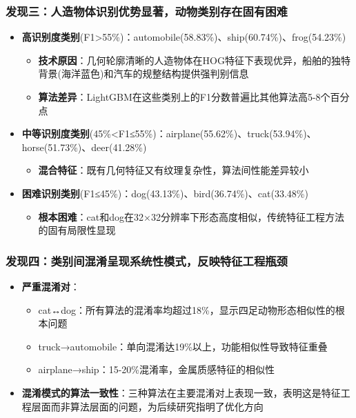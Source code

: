 \documentclass[UTF8]{report}
\theoremstyle{MyLineTheoremStyle} %
\theoremstyle{MyBlockTheoremStyle} %
\theoremstyle{MySubsubsectionStyle} %
\begin{document}
\subsubsection{发现三：人造物体识别优势显著，动物类别存在固有困难}
\begin{itemize}
    \item \textbf{高识别度类别}(F1>55\%)：automobile(58.83\%)、ship(60.74\%)、frog(54.23\%)
    \begin{itemize}
        \item \textbf{技术原因}：几何轮廓清晰的人造物体在HOG特征下表现优异，船舶的独特背景(海洋蓝色)和汽车的规整结构提供强判别信息
        \item \textbf{算法差异}：LightGBM在这些类别上的F1分数普遍比其他算法高5-8个百分点
    \end{itemize}
    \item \textbf{中等识别度类别}(45\%<F1≤55\%)：airplane(55.62\%)、truck(53.94\%)、horse(51.73\%)、deer(41.28\%)
    \begin{itemize}
        \item \textbf{混合特征}：既有几何特征又有纹理复杂性，算法间性能差异较小
    \end{itemize}
    \item \textbf{困难识别类别}(F1≤45\%)：dog(43.13\%)、bird(36.74\%)、cat(33.48\%)
    \begin{itemize}
        \item \textbf{根本困难}：cat和dog在32×32分辨率下形态高度相似，传统特征工程方法的固有局限性显现
    \end{itemize}
\end{itemize}

\subsubsection{发现四：类别间混淆呈现系统性模式，反映特征工程瓶颈}
\begin{itemize}
    \item \textbf{严重混淆对}：
    \begin{itemize}
        \item cat↔dog：所有算法的混淆率均超过18\%，显示四足动物形态相似性的根本问题
        \item truck→automobile：单向混淆达19\%以上，功能相似性导致特征重叠
        \item airplane→ship：15-20\%混淆率，金属质感特征的相似性
    \end{itemize}
    \item \textbf{混淆模式的算法一致性}：三种算法在主要混淆对上表现一致，表明这是特征工程层面而非算法层面的问题，为后续研究指明了优化方向
\end{itemize}
\end{document}
